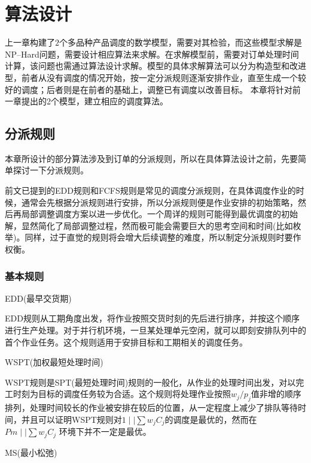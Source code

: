 \newcommand{\jobunit}[1]{*+[F]{\makebox[1.5em]{$#1$}}}
\newcommand{\process}[1]{*++=[o][F]{\makebox[2em]{$#1$}}}
\theoremheaderfont{\heiti}
\newtheorem{algori}[algor]{算法}%
\chapter{算法设计}
上一章构建了$2$个多品种产品调度的数学模型，需要对其检验，而这些模型求解是NP--Hard问题，需要设计相应算法来求解。在求解模型前，需要对订单处理时间计算，该问题也需通过算法设计求解。模型的具体求解算法可以分为构造型和改进型，前者从没有调度的情况开始，按一定分派规则逐渐安排作业，直至生成一个较好的调度；后者则是在前者的基础上，调整已有调度以改善目标。
本章将针对前一章提出的2个模型，建立相应的调度算法。

\section{分派规则}
本章所设计的部分算法涉及到订单的分派规则，所以在具体算法设计之前，先要简单探讨一下分派规则。

前文已提到的EDD规则和FCFS规则是常见的调度分派规则，在具体调度作业的时候，通常会先根据分派规则进行安排，所以分派规则便是作业安排的初始策略，然后再局部调整调度方案以进一步优化。一个周详的规则可能得到最优调度的初始解，显然简化了局部调整过程，然而极可能会需要巨大的思考空间和时间(比如枚举)。同样，过于直觉的规则将会增大后续调整的难度，所以制定分派规则时要作权衡。
\subsection{基本规则}
\begin{asparaenum}
\item EDD(最早交货期)

EDD规则从工期角度出发，将作业按照交货时刻的先后进行排序，并按这个顺序进行生产处理。对于并行机环境，一旦某处理单元空闲，就可以即刻安排队列中的首个作业任务。这个规则适用于安排目标和工期相关的调度任务。
\item WSPT(加权最短处理时间)

WSPT规则是SPT(最短处理时间)规则的一般化，从作业的处理时间出发，对以完工时刻为目标的调度任务较为合适。这个规则将处理作业按照$w_j/p_j$值非增的顺序排列，处理时间较长的作业被安排在较后的位置，从一定程度上减少了排队等待时间，并且可以证明WSPT规则对$1\mid \mid \sum w_jC_j$的调度是最优的\cite{pinedo}，然而在$Pm \mid \mid \sum w_jC_j$ 环境下并不一定是最优。

\item MS(最小松弛)
\end{asparaenum}

